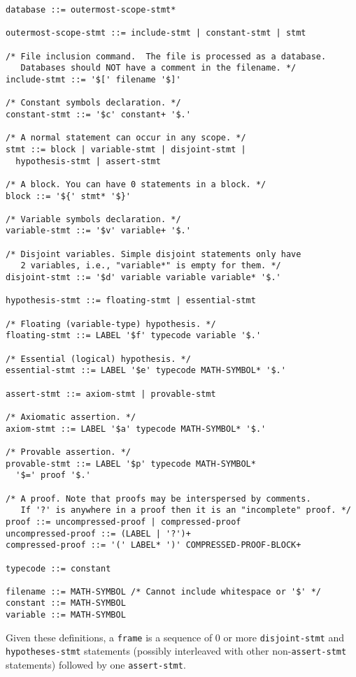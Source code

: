 \begin{verbatim}
database ::= outermost-scope-stmt*

outermost-scope-stmt ::= include-stmt | constant-stmt | stmt

/* File inclusion command.  The file is processed as a database.
   Databases should NOT have a comment in the filename. */
include-stmt ::= '$[' filename '$]'

/* Constant symbols declaration. */
constant-stmt ::= '$c' constant+ '$.'

/* A normal statement can occur in any scope. */
stmt ::= block | variable-stmt | disjoint-stmt |
  hypothesis-stmt | assert-stmt

/* A block. You can have 0 statements in a block. */
block ::= '${' stmt* '$}'

/* Variable symbols declaration. */
variable-stmt ::= '$v' variable+ '$.'

/* Disjoint variables. Simple disjoint statements only have
   2 variables, i.e., "variable*" is empty for them. */
disjoint-stmt ::= '$d' variable variable variable* '$.'

hypothesis-stmt ::= floating-stmt | essential-stmt

/* Floating (variable-type) hypothesis. */
floating-stmt ::= LABEL '$f' typecode variable '$.'

/* Essential (logical) hypothesis. */
essential-stmt ::= LABEL '$e' typecode MATH-SYMBOL* '$.'

assert-stmt ::= axiom-stmt | provable-stmt

/* Axiomatic assertion. */
axiom-stmt ::= LABEL '$a' typecode MATH-SYMBOL* '$.'

/* Provable assertion. */
provable-stmt ::= LABEL '$p' typecode MATH-SYMBOL*
  '$=' proof '$.'

/* A proof. Note that proofs may be interspersed by comments.
   If '?' is anywhere in a proof then it is an "incomplete" proof. */
proof ::= uncompressed-proof | compressed-proof
uncompressed-proof ::= (LABEL | '?')+
compressed-proof ::= '(' LABEL* ')' COMPRESSED-PROOF-BLOCK+

typecode ::= constant

filename ::= MATH-SYMBOL /* Cannot include whitespace or '$' */
constant ::= MATH-SYMBOL
variable ::= MATH-SYMBOL
\end{verbatim}

Given these definitions, a \texttt{frame} is a sequence of 0 or more
\texttt{disjoint-stmt} and \texttt{hypotheses-stmt} statements
(possibly interleaved with other non-\texttt{assert-stmt} statements)
followed by one \texttt{assert-stmt}.

